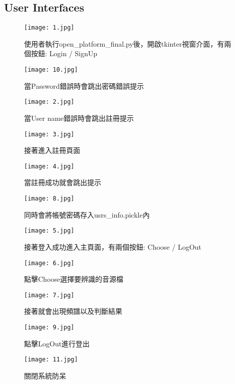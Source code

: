 \documentclass{scrreprt}
\begin{document}
\begin{CJK*}{UTF8}{bsmi}
\section{User Interfaces}
\begin{figure} 
\centering
\texttt{[image: 1.jpg]}
\caption{使用者執行open_platform_final.py後，開啟tkinter視窗介面，有兩個按鈕: 
Login / SignUp}
\end{figure}
\begin{figure} [h]
\centering
\texttt{[image: 10.jpg]}
\caption{當Password錯誤時會跳出密碼錯誤提示}
\end{figure}
\begin{figure} [h]
\centering
\texttt{[image: 2.jpg]}
\caption{當User name錯誤時會跳出註冊提示}
\end{figure}
\begin{figure} [h]
\centering
\texttt{[image: 3.jpg]}
\caption{接著進入註冊頁面}
\end{figure}
\begin{figure} [h]
\centering
\texttt{[image: 4.jpg]}
\caption{當註冊成功就會跳出提示}
\end{figure}
\begin{figure} [h]
\centering
\texttt{[image: 8.jpg]}
\caption{同時會將帳號密碼存入usrs_info.pickle內}
\end{figure}
\begin{figure} [h]
\centering
\texttt{[image: 5.jpg]}
\caption{接著登入成功進入主頁面，有兩個按鈕: Choose / LogOut}
\end{figure}

\begin{figure} [h]
\centering
\texttt{[image: 6.jpg]}
\caption{點擊Choose選擇要辨識的音源檔}
\end{figure}
\begin{figure} [h]
\centering
\texttt{[image: 7.jpg]}
\caption{接著就會出現頻譜以及判斷結果}
\end{figure}
\begin{figure} [h]
\centering
\texttt{[image: 9.jpg]}
\caption{點擊LogOut進行登出}
\end{figure}
\begin{figure} [h]
\centering
\texttt{[image: 11.jpg]}
\caption{關閉系統防呆}
\end{figure}
\clearpage

\end{CJK*}
\end{document}
